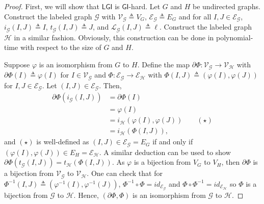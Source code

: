 \documentclass{article}
\newcommand{\Lc}{\mathcal{L}}  %
\newcommand{\Gc}{\mathcal{G}}  %
\newcommand{\Hc}{\mathcal{H}}  %
\newcommand{\Vc}{\mathcal{V}}
\newcommand{\Ec}{\mathcal{E}}
\newcommand{\GI}{\textsf{GI}}
\newcommand{\LGI}{\textsf{LGI}}
\theoremstyle{definition}
\begin{document}
\begin{proof}
    

    First, we will show that \(\LGI\) is \(\GI\)-hard. Let 
    \(G\) and \(H\) be undirected graphs. Construct the labeled graph \(\Gc\) 
    with \(\Vc_\Gc \triangleq V_G\), \(\Ec_\Gc \triangleq E_G\) and for all \(I, J \in \Ec_\Gc\),
    \(i_\Gc(I, J) \triangleq I\), \(t_\Gc(I, J) \triangleq J\), and \(\Lc_\Gc(I, J) \triangleq \ell\). 
    Construct the labeled graph \(\Hc\) in a similar fashion. Obviously, this construction can be done in polynomial-time with respect 
    to the size of \(G\) and \(H\).

    Suppose \(\varphi\) is an isomorphism from \(G\) to \(H\). Define the map 
    \(\partial\Phi : \Vc_\Gc \to \Vc_\Hc\) with \(\partial\Phi(I) \triangleq \varphi(I)\) for \(I \in \Vc_\Gc\) 
    and \(\Phi : \Ec_\Gc \to \Ec_\Hc\) with \(\Phi(I, J) \triangleq (\varphi(I), \varphi(J))\)
    for \(I, J \in \Ec_\Gc\).
    Let \((I, J) \in \Ec_\Gc\). Then, 
    \begin{align*}
        \partial\Phi(i_\Gc(I, J)) &= \partial\Phi(I) \\ 
        &= \varphi(I) \\
        &= i_\Hc(\varphi(I), \varphi(J)) \qquad (\star)\\ 
        &= i_\Hc(\Phi(I, J)),
    \end{align*}
    and \((\star)\) is well-defined as \((I, J) \in \Ec_\Gc = E_G\) if and only if \((\varphi(I), \varphi(J)) \in E_H = \Ec_\Hc\).
    A similar deduction can be used to show \(\partial\Phi(t_\Gc(I, J)) = t_\Hc(\Phi(I, J))\). 
    As \(\varphi\) is a bijection from \(V_G\) to \(V_H\), then \(\partial\Phi\) is a 
    bijection from \(\Vc_\Gc\) to \(\Vc_\Hc\). One can check that for \(\Phi^{-1}(I, J) \triangleq (\varphi^{-1}(I), \varphi^{-1}(J))\),
    \(\Phi^{-1} \circ \Phi = id_{\Ec_\Gc}\) and \(\Phi \circ \Phi^{-1} = id_{\Ec_\Hc}\) 
    so \(\Phi\) is a bijection from \(\Gc\) to \(\Hc\). Hence, \((\partial\Phi, \Phi)\) is an 
    isomorphism from \(\Gc\) to \(\Hc\).


\end{proof}
\end{document}
